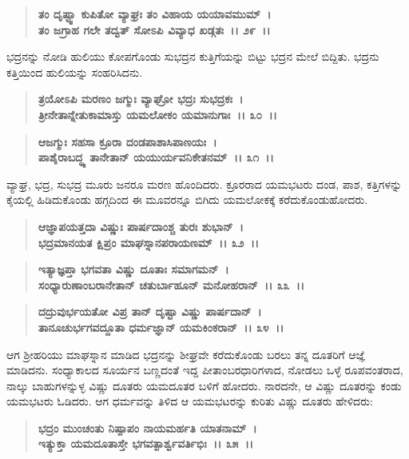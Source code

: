 \begin{verse}
\textbf{ತಂ ದೃಷ್ಟ್ವಾ ಕುಪಿತೋ ವ್ಯಾಘ್ರಃ ತಂ ವಿಹಾಯ ಯಯಾವಮುಮ್~।}\\\textbf{ತಂ ಜಗ್ರಾಹ ಗಲೇ ತದ್ವತ್ ಸೋಽಪಿ ವಿವ್ಯಾಧ ಖಡ್ಗತಃ~।। ೨೯~।।}
\end{verse}

ಭದ್ರನನ್ನು ನೋಡಿ ಹುಲಿಯು ಕೋಪಗೊಂಡು ಸುಭದ್ರನ ಕುತ್ತಿಗೆಯನ್ನು ಬಿಟ್ಟು ಭದ್ರನ ಮೇಲೆ ಬಿದ್ದಿತು. ಭದ್ರನು ಕತ್ತಿಯಿಂದ ಹುಲಿಯನ್ನು ಸಂಹರಿಸಿದನು.

\begin{verse}
\textbf{ತ್ರಯೋಽಪಿ ಮರಣಂ ಜಗ್ಮುಃ ವ್ಯಾಘ್ರೋ ಭದ್ರಃ ಸುಭದ್ರಕಃ~।}\\\textbf{ತ್ರೀನೇತಾನ್ನೇತುಕಾಮಾಸ್ತು ಯಮಲೋಕಂ ಯಮಾನುಗಾಃ~।। ೩೦~।।} 
\end{verse}

\begin{verse}
\textbf{ಆಜಗ್ಮುಃ ಸಹಸಾ ಕ್ರೂರಾ ದಂಡಪಾಶಾಸಿಪಾಣಯಃ~।}\\\textbf{ಪಾಶೈರಾಬದ್ಧ್ಯ ತಾನೇತಾನ್ ಯಯುರ್ಯವನಿಕೇತನಮ್~।। ೩೧~।।}
\end{verse}

ವ್ಯಾಘ್ರ, ಭದ್ರ, ಸುಭದ್ರ ಮೂರು ಜನರೂ ಮರಣ ಹೊಂದಿದರು. ಕ್ರೂರರಾದ ಯಮಭಟರು ದಂಡ, ಪಾಶ, ಕತ್ತಿಗಳನ್ನು ಕೈಯಲ್ಲಿ ಹಿಡಿದುಕೊಂಡು ಹಗ್ಗದಿಂದ ಈ ಮೂವರನ್ನೂ ಬಿಗಿದು ಯಮಲೋಕಕ್ಕೆ ಕರೆದುಕೊಂಡುಹೋದರು.

\begin{verse}
\textbf{ಆಜ್ಞಾಪಯತ್ತದಾ ವಿಷ್ಣುಃ ಪಾರ್ಷದಾಂಶ್ಚ ತುರಃ ಶುಭಾನ್~।}\\\textbf{ಭದ್ರಮಾನಯತ ಕ್ಷಿಪ್ರಂ ಮಾಘಸ್ನಾನಪರಾಯಣಮ್~।। ೩೨~।।} 
\end{verse}

\begin{verse}
\textbf{ಇತ್ಯಾಜ್ಞಪ್ತಾ ಭಗವತಾ ವಿಷ್ಣು ದೂತಾಃ ಸಮಾಗಮನ್~।}\\\textbf{ಸಂಧ್ಯಾರುಣಾಂಬರಾನೇತಾನ್ ಚತುರ್ಬಾಹೂನ್ ಮನೋಹರಾನ್~।। ೩೩~।। }
\end{verse}

\begin{verse}
\textbf{ದದ್ರುವುರ್ಭಯತೋ ವಿಪ್ರ ತಾನ್ ದೃಷ್ಟಾ ವಿಷ್ಣು ಪಾರ್ಷದಾನ್~।}\\\textbf{ತಾನೂಚುರ್ಭಗವದ್ದೂತಾ ಧರ್ಮಜ್ಞಾನ್ ಯಮಕಿಂಕರಾನ್~।। ೩೪~।।}
\end{verse}

ಆಗ ಶ‍್ರೀಹರಿಯು ಮಾಘಸ್ನಾನ ಮಾಡಿದ ಭದ್ರನನ್ನು ಶೀಘ್ರವೇ ಕರೆದುಕೊಂಡು ಬರಲು ತನ್ನ ದೂತರಿಗೆ ಆಜ್ಞೆ ಮಾಡಿದನು. ಸಂಧ್ಯಾಕಾಲದ ಸೂರ್ಯನ ಬಣ್ಣದಂತೆ ಇದ್ದ ಪೀತಾಂಬರಧಾರಿಗಳಾದ, ನೋಡಲು ಒಳ್ಳೆ ರೂಪವಂತರಾದ, ನಾಲ್ಕು ಬಾಹುಗಳನ್ನುಳ್ಳ ವಿಷ್ಣು ದೂತರು ಯಮದೂತರ ಬಳಿಗೆ ಹೋದರು. ನಾರದನೇ, ಆ ವಿಷ್ಣು ದೂತರನ್ನು ಕಂಡು ಯಮಭಟರು ಓಡಿದರು. ಆಗ ಧರ್ಮವನ್ನು ತಿಳಿದ ಆ ಯಮಭಟರನ್ನು ಕುರಿತು ವಿಷ್ಣು ದೂತರು ಹೇಳಿದರು:

\begin{verse}
\textbf{ಭದ್ರಂ ಮುಂಚಂತು ನಿಷ್ಪಾಪಂ ನಾಯಮರ್ಹತಿ ಯಾತನಾಮ್~।}\\\textbf{ಇತ್ಯುಕ್ತಾ ಯಮದೂತಾಸ್ತೇ ಭಗವತ್ಪಾರ್ಶ್ವವರ್ತಿಭಿಃ~।। ೩೫~।।}
\end{verse}

